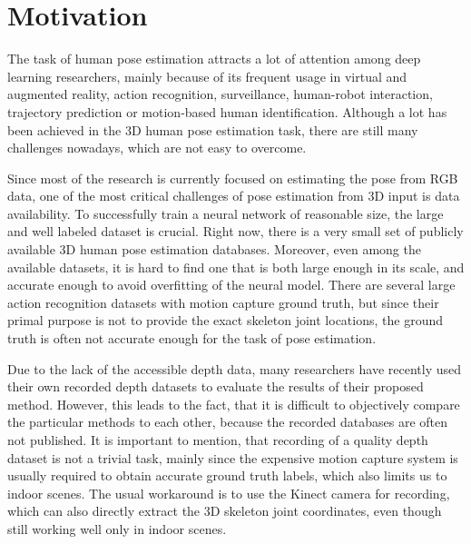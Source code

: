 \chapter{Motivation}\label{chap:motivation}

The task of human pose estimation attracts a lot of attention among deep learning researchers, mainly because of its frequent usage in virtual and augmented reality, action recognition, surveillance, human-robot interaction, trajectory prediction or motion-based human identification. Although a lot has been achieved in the 3D human pose estimation task, there are still many challenges nowadays, which are not easy to overcome.\par
\vspace{5mm}
\noindent Since most of the research is currently focused on estimating the pose from RGB data, one of the most critical challenges of pose estimation from 3D input is data availability. To successfully train a neural network of reasonable size, the large and well labeled dataset is crucial. Right now, there is a very small set of publicly available 3D human pose estimation databases. Moreover, even among the available datasets, it is hard to find one that is both large enough in its scale, and accurate enough to avoid overfitting of the neural model. There are several large action recognition datasets with motion capture ground truth, but since their primal purpose is not to provide the exact skeleton joint locations, the ground truth is often not accurate enough for the task of pose estimation.\par
\vspace{5mm}
\noindent Due to the lack of the accessible depth data, many researchers have recently used their own recorded depth datasets to evaluate the results of their proposed method. However, this leads to the fact, that it is difficult to objectively compare the particular methods to each other, because the recorded databases are often not published.
It is important to mention, that recording of a quality depth dataset is not a trivial task, mainly since the expensive motion capture system is usually required to obtain accurate ground truth labels, which also limits us to indoor scenes. The usual workaround is to use the Kinect camera for recording, which can also directly extract the 3D skeleton joint coordinates, even though still working well only in indoor scenes.\par
